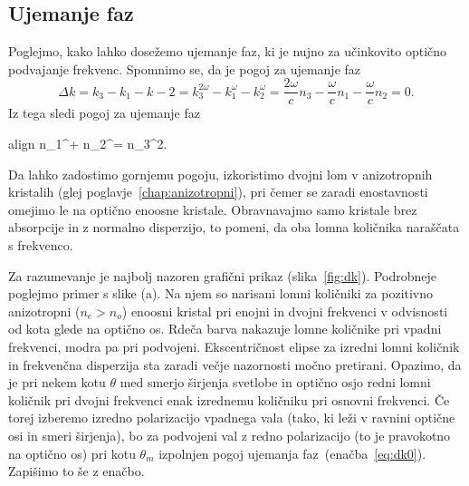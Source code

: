 \documentclass[11pt,fleqn]{book} %
\newcommand{\boxeq}[2]{\begin{empheq}[box=\colorbox{ocre!30}]{align}\label{#1}#2\end{empheq}}
\newcommand{\beq}{\begin{equation}}
\newcommand{\eeq}{\end{equation}}
\begin{document}
\subsection*{Ujemanje faz}
Poglejmo, kako lahko dosežemo ujemanje faz, ki je nujno za učinkovito optično
podvajanje frekvenc. Spomnimo se, da je pogoj za ujemanje faz 
\beq
\Delta k = k_3 - k_1 -k-2 = k_3^{2\omega} - k_1^{\omega} -k_2^\omega = 
\frac{2\omega}{c} n_3 - \frac{\omega}{c} n_1- \frac{\omega}{c} n_2 =0.
\eeq
Iz tega sledi pogoj za ujemanje faz
\boxeq{eq:dk0}{
n_1^\omega + n_2^\omega = n_3^{2\omega}.
}
Da lahko zadostimo gornjemu pogoju, izkoristimo dvojni lom v anizotropnih kristalih
(glej poglavje~\ref{chap:anizotropni}), pri čemer se zaradi enostavnosti omejimo le na optično 
enoosne kristale. Obravnavajmo samo kristale brez absorpcije in z normalno disperzijo, 
to pomeni, da oba lomna količnika naraščata s frekvenco.  


Za razumevanje je najbolj nazoren grafični prikaz (slika~\ref{fig:dk}). 
Podrobneje poglejmo primer s slike (a). Na njem so narisani lomni količniki za pozitivno
anizotropni ($n_e>n_o$) enoosni kristal pri enojni in dvojni
frekvenci v odvisnosti od kota glede na optično os. Rdeča barva nakazuje lomne količnike
pri vpadni frekvenci, modra pa pri podvojeni. Ekscentričnost elipse za 
izredni lomni količnik in frekvenčna disperzija sta zaradi večje nazornosti močno 
pretirani. Opazimo, da je pri nekem kotu $\theta$ med smerjo širjenja svetlobe in optično 
osjo redni lomni količnik pri dvojni frekvenci enak izrednemu količniku pri osnovni
frekvenci. Če torej izberemo izredno polarizacijo vpadnega vala (tako, ki leži
v ravnini optične osi in smeri širjenja), bo za podvojeni val z redno
polarizacijo (to je pravokotno na optično os) pri kotu
$\theta_m$ izpolnjen pogoj ujemanja faz~(enačba~\ref{eq:dk0}). Zapišimo to še z enačbo.\\
\end{document}
